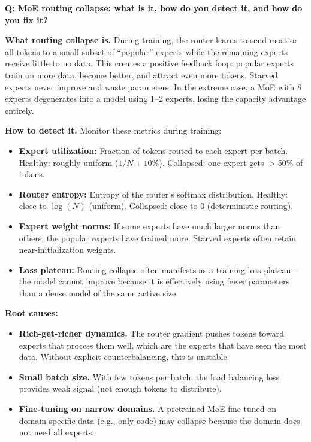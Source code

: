 \begin{interviewq}
\textbf{Q: MoE routing collapse: what is it, how do you detect it, and how do you fix it?}

 \quad {} \quad \badgefreq{\freqmed}

\stronganswer

\textbf{What routing collapse is.} During training, the router learns to send most or all tokens to a small subset of ``popular'' experts while the remaining experts receive little to no data. This creates a positive feedback loop: popular experts train on more data, become better, and attract even more tokens. Starved experts never improve and waste parameters. In the extreme case, a MoE with 8 experts degenerates into a model using 1--2 experts, losing the capacity advantage entirely.

\textbf{How to detect it.} Monitor these metrics during training:
\begin{itemize}
    \item \textbf{Expert utilization:} Fraction of tokens routed to each expert per batch. Healthy: roughly uniform ($1/N \pm 10\%$). Collapsed: one expert gets $>$50\% of tokens.
    \item \textbf{Router entropy:} Entropy of the router's softmax distribution. Healthy: close to $\log(N)$ (uniform). Collapsed: close to 0 (deterministic routing).
    \item \textbf{Expert weight norms:} If some experts have much larger norms than others, the popular experts have trained more. Starved experts often retain near-initialization weights.
    \item \textbf{Loss plateau:} Routing collapse often manifests as a training loss plateau---the model cannot improve because it is effectively using fewer parameters than a dense model of the same active size.
\end{itemize}

\textbf{Root causes:}
\begin{itemize}
    \item \textbf{Rich-get-richer dynamics.} The router gradient pushes tokens toward experts that process them well, which are the experts that have seen the most data. Without explicit counterbalancing, this is unstable.
    \item \textbf{Small batch size.} With few tokens per batch, the load balancing loss provides weak signal (not enough tokens to distribute).
    \item \textbf{Fine-tuning on narrow domains.} A pretrained MoE fine-tuned on domain-specific data (e.g., only code) may collapse because the domain does not need all experts.
\end{itemize}


\end{interviewq}
